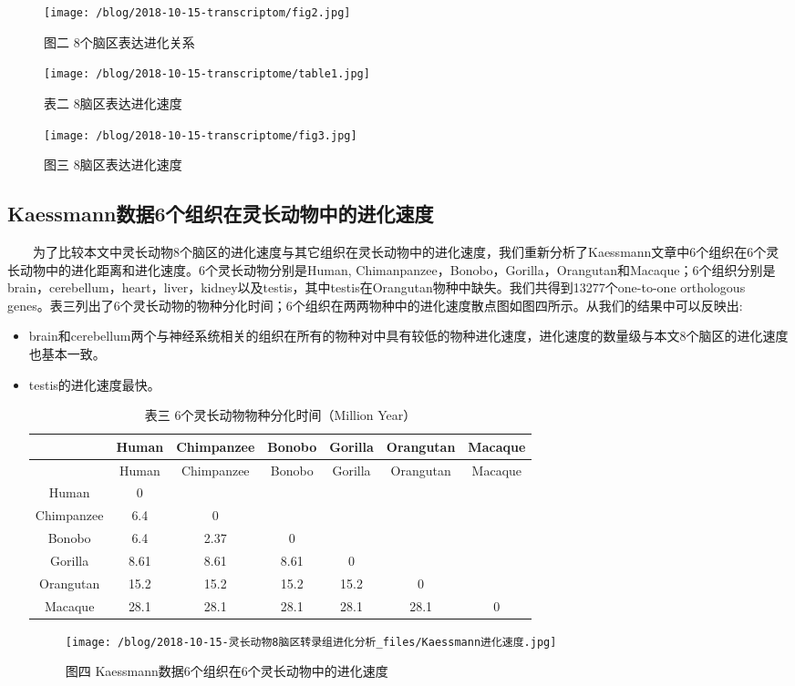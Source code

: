 \documentclass[hyperref,]{ctexart}
\providecommand{\tightlist}{%
  \setlength{\itemsep}{0pt}\setlength{\parskip}{0pt}}
\begin{document}
\begin{figure}
\centering
\texttt{[image: /blog/2018-10-15-transcriptom/fig2.jpg]}
\caption{图二 8个脑区表达进化关系}
\end{figure}

\begin{figure}
\centering
\texttt{[image: /blog/2018-10-15-transcriptome/table1.jpg]}
\caption{表二 8脑区表达进化速度}
\end{figure}

\begin{figure}
\centering
\texttt{[image: /blog/2018-10-15-transcriptome/fig3.jpg]}
\caption{图三 8脑区表达进化速度}
\end{figure}

\hypertarget{kaessmann6}{%
\subsection{Kaessmann数据6个组织在灵长动物中的进化速度}\label{kaessmann6}}

  为了比较本文中灵长动物8个脑区的进化速度与其它组织在灵长动物中的进化速度，我们重新分析了Kaessmann文章中6个组织在6个灵长动物中的进化距离和进化速度。6个灵长动物分别是Human,
Chimanpanzee，Bonobo，Gorilla，Orangutan和Macaque；6个组织分别是brain，cerebellum，heart，liver，kidney以及testis，其中testis在Orangutan物种中缺失。我们共得到13277个one-to-one
orthologous
genes。表三列出了6个灵长动物的物种分化时间；6个组织在两两物种中的进化速度散点图如图四所示。从我们的结果中可以反映出:

\begin{itemize}
\tightlist
\item
  brain和cerebellum两个与神经系统相关的组织在所有的物种对中具有较低的物种进化速度，进化速度的数量级与本文8个脑区的进化速度也基本一致。
\item
  testis的进化速度最快。

  \begin{longtable}[]{@{}ccccccc@{}}
  \caption{表三 6个灵长动物物种分化时间（Million Year）}\tabularnewline
  \toprule
  & Human & Chimpanzee & Bonobo & Gorilla & Orangutan &
  Macaque\tabularnewline
  \midrule
  \endfirsthead
  \toprule
  & Human & Chimpanzee & Bonobo & Gorilla & Orangutan &
  Macaque\tabularnewline
  \midrule
  \endhead
  Human & 0 & &\tabularnewline
  Chimpanzee & 6.4 & 0 &\tabularnewline
  Bonobo & 6.4 & 2.37 & 0 &\tabularnewline
  Gorilla & 8.61 & 8.61 & 8.61 & 0 &\tabularnewline
  Orangutan & 15.2 & 15.2 & 15.2 & 15.2 & 0 &\tabularnewline
  Macaque & 28.1 & 28.1 & 28.1 & 28.1 & 28.1 & 0\tabularnewline
  \bottomrule
  \end{longtable}

  \begin{figure}
  \centering
  \texttt{[image: /blog/2018-10-15-灵长动物8脑区转录组进化分析\_files/Kaessmann进化速度.jpg]}
  \caption{图四 Kaessmann数据6个组织在6个灵长动物中的进化速度}
  \end{figure}
\end{itemize}
\end{document}
